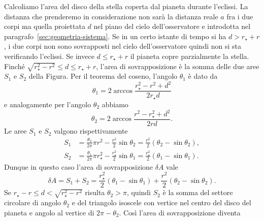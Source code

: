 Calcoliamo l'area del disco della stella coperta dal pianeta durante
l'eclissi. La distanza che prenderemo in considerazione non sarà la distanza
reale $a$ fra i due corpi ma quella proiettata $d$ nel piano del cielo
dell'osservatore e introdotta nel paragrafo~\ref{sec:geometria-sistema}. Se in
un certo istante di tempo si ha $d > r_\star + r$, i due corpi non sono
sovrapposti nel cielo dell'osservatore quindi non si sta verificando
l'eclissi. Se invece $d \leq r_\star + r$ il pianeta copre parzialmente la
stella. Finché $\sqrt{r_\star^2 - r^2} \leq d \leq r_\star + r$, l'area di
sovrapposizione è la somma delle due aree $S_1$ e $S_2$ della
Figura. %
Per il teorema del coseno, l'angolo $\theta_1$ %
è dato da
\begin{equation}
  \theta_1 = 2 \arccos \frac{r_\star^2 - r^2 + d^2}{2r_\star d}
\end{equation}
e analogamente per l'angolo $\theta_2$ abbiamo
\begin{equation}
  \theta_2 = 2 \arccos \frac{r^2 - r_\star^2 + d^2}{2rd}.
\end{equation}
Le aree $S_1$ e $S_2$ valgono rispettivamente
\begin{subequations}
  \begin{align}
    S_1 &= \frac{\theta_2}{2\pi}\pi r^2 - \frac{r^2}{2}\sin\theta_2 =
    \frac{r^2}{2}(\theta_2 - \sin\theta_2), \\
    S_2 &= \frac{\theta_1}{2\pi}\pi r_\star^2 - \frac{r_\star^2}{2}\sin\theta_1
    = \frac{r_\star^2}{2}(\theta_1 - \sin\theta_1).
  \end{align}
\end{subequations}
Dunque in questo caso l'area di sovrapposizione $\delta A$ vale
\begin{equation}
  \delta A = S_1 + S_2 = \frac{r_\star^2}{2}(\theta_1 - \sin\theta_1) +
  \frac{r^2}{2}(\theta_2 - \sin\theta_2).
\end{equation}
Se $r_\star - r \leq d < \sqrt{r_\star^2 - r^2}$ risulta $\theta_2 > \pi$,
quindi $S_2$ è la somma del settore circolare di angolo $\theta_2$ e del
triangolo isoscele con vertice nel centro del disco del pianeta e angolo al
vertice di $2\pi - \theta_2$. Così l'area di sovrapposizione diventa
